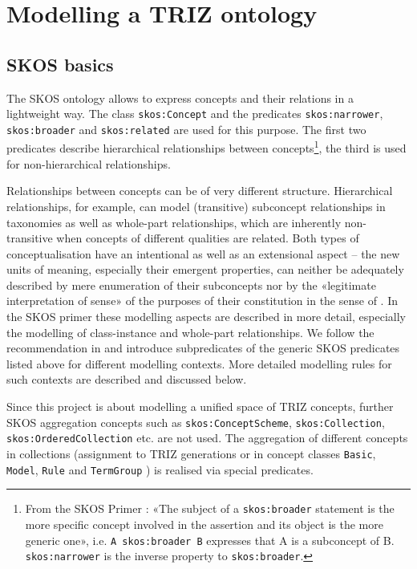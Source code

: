 \documentclass[11pt,a4paper]{article}
\begin{document}
\section{Modelling a TRIZ ontology}

\subsection{SKOS basics}

The SKOS ontology allows to express concepts and their relations in a
lightweight way. The class \texttt{skos:Concept} and the predicates
\texttt{skos:narrower}, \texttt{skos:broader} and \texttt{skos:related} are
used for this purpose. The first two predicates describe hierarchical
relationships between concepts\footnote{From the SKOS Primer
  \cite{SKOS-Primer}: «The subject of a \texttt{skos:broader} statement is the
  more specific concept involved in the assertion and its object is the more
  generic one», i.e. \texttt{A skos:broader B} expresses that A is a
  subconcept of B.  \texttt{skos:narrower} is the inverse property to
  \texttt{skos:broader}.}, the third is used for non-hierarchical
relationships.

Relationships between concepts can be of very different structure.
Hierarchical relationships, for example, can model (transitive) subconcept
relationships in taxonomies as well as whole-part relationships, which are
inherently non-transitive when concepts of different qualities are related.
Both types of conceptualisation have an intentional as well as an extensional
aspect -- the new units of meaning, especially their emergent properties, can
neither be adequately described by mere enumeration of their subconcepts nor
by the «legitimate interpretation of sense» of the purposes of their
constitution in the sense of \cite{BergerLuckmann}. In the SKOS primer
\cite{SKOS-Primer} these modelling aspects are described in more detail,
especially the modelling of class-instance and whole-part relationships. We
follow the recommendation in \cite[Sect 4.7]{SKOS-Primer} and introduce
subpredicates of the generic SKOS predicates listed above for different
modelling contexts. More detailed modelling rules for such contexts are
described and discussed below.

Since this project is about modelling a unified space of TRIZ concepts,
further SKOS aggregation concepts such as \texttt{skos:ConceptScheme},
\texttt{skos:Collection}, \texttt{skos:OrderedCollection} etc. are not used.
The aggregation of different concepts in collections (assignment to TRIZ
generations \cite[Table 1]{TOP2020} or in concept classes \texttt{Basic},
\texttt{Model}, \texttt{Rule} and \texttt{TermGroup} \cite[Fig. 4]{TOP2020})
is realised via special predicates.
\end{document}
